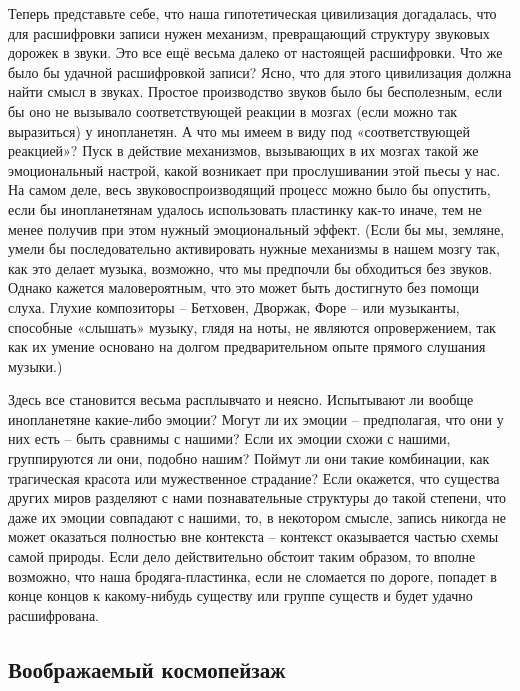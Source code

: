 \documentclass[../main.tex]{subfiles}
\begin{document}
Теперь представьте себе, что наша гипотетическая цивилизация догадалась, что для расшифровки записи нужен механизм, превращающий структуру звуковых дорожек в звуки. Это все ещё весьма далеко от настоящей расшифровки. Что же было бы удачной расшифровкой записи? Ясно, что для этого цивилизация должна найти смысл в звуках. Простое производство звуков было бы бесполезным, если бы оно не вызывало соответствующей реакции в мозгах (если можно так выразиться) у инопланетян. А что мы имеем в виду под «соответствующей реакцией»? Пуск в действие механизмов, вызывающих в их мозгах такой же эмоциональный настрой, какой возникает при прослушивании этой пьесы у нас. На самом деле, весь звуковоспроизводящий процесс можно было бы опустить, если бы инопланетянам удалось использовать пластинку как-то иначе, тем не менее получив при этом нужный эмоциональный эффект. (Если бы мы, земляне, умели бы последовательно активировать нужные механизмы в нашем мозгу так, как это делает музыка, возможно, что мы предпочли бы обходиться без звуков. Однако кажется маловероятным, что это может быть достигнуто без помощи слуха. Глухие композиторы \--- Бетховен, Дворжак, Форе \--- или музыканты, способные «слышать» музыку, глядя на ноты, не являются опровержением, так как их умение основано на долгом предварительном опыте прямого слушания музыки.)

Здесь все становится весьма расплывчато и неясно. Испытывают ли вообще инопланетяне какие-либо эмоции? Могут ли их эмоции \--- предполагая, что они у них есть \--- быть сравнимы с нашими? Если их эмоции схожи с нашими, группируются ли они, подобно нашим? Поймут ли они такие комбинации, как трагическая красота или мужественное страдание? Если окажется, что существа других миров разделяют с нами познавательные структуры до такой степени, что даже их эмоции совпадают с нашими, то, в некотором смысле, запись никогда не может оказаться полностью вне контекста \--- контекст оказывается частью схемы самой природы. Если дело действительно обстоит таким образом, то вполне возможно, что наша бродяга-пластинка, если не сломается по дороге, попадет в конце концов к какому-нибудь существу или группе существ и будет удачно расшифрована.


\subsection{Воображаемый космопейзаж}
\end{document}
